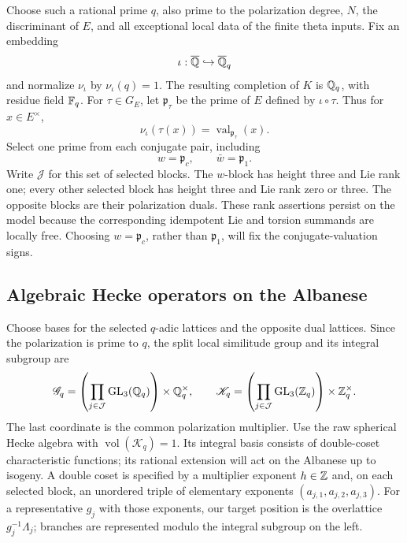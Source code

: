 Choose such a rational prime \(q\), also prime to the polarization
degree, \(N\), the discriminant of \(E\), and all exceptional local
data of the finite theta inputs.  Fix an embedding
\[
\iota:\overline{\mathbb{Q}}\hookrightarrow\overline{\mathbb{Q}}_q
\]
and normalize \(\nu_\iota\) by \(\nu_\iota(q)=1\).  The resulting
completion of \(K\) is \(\mathbb{Q}_q\), with residue field \(\mathbb{F}_q\).
For \(\tau\in G_E\), let \(\mathfrak p_\tau\) be the prime of \(E\)
defined by \(\iota\circ\tau\).  Thus for \(x\in E^\times\),
\[
\nu_\iota(\tau(x))=\operatorname{val}_{\mathfrak p_\tau}(x).
\]
Select one prime from each conjugate pair, including
\begin{equation}\label{eq:active-prime}
w=\mathfrak p_c,\qquad \bar w=\mathfrak p_1.
\end{equation}
Write \(\mathcal J\) for this set of selected blocks.  The
\(w\)-block has height three and Lie rank one; every other selected
block has height three and Lie rank zero or three.  The opposite
blocks are their polarization duals.  These rank assertions persist
on the model because the corresponding idempotent Lie and torsion
summands are locally free.  Choosing \(w=\mathfrak p_c\), rather
than \(\mathfrak p_1\), will fix the conjugate-valuation signs.

\subsection{Algebraic Hecke operators on the Albanese}\label{subsec:algebraic-hecke}

Choose bases for the selected \(q\)-adic lattices and the opposite
dual lattices.  Since the polarization is prime to \(q\), the split
local similitude group and its integral subgroup are
\[
\mathscr G_q=
\left(\prod_{j\in\mathcal J}\operatorname{GL}_3(\mathbb{Q}_q)\right)\times\mathbb{Q}_q^\times,
\qquad
\mathscr K_q=
\left(\prod_{j\in\mathcal J}\operatorname{GL}_3(\mathbb{Z}_q)\right)\times\mathbb{Z}_q^\times.
\]
The last coordinate is the common polarization multiplier.
Use the raw spherical Hecke algebra with
\(\operatorname{vol}(\mathscr K_q)=1\).  Its integral basis consists
of double-coset characteristic functions; its rational extension
will act on the Albanese up to isogeny.  A double coset is specified
by a multiplier exponent \(h\in\mathbb{Z}\) and, on each selected block,
an unordered triple of elementary exponents
\((a_{j,1},a_{j,2},a_{j,3})\).
For a representative \(g_j\) with those exponents, our target
position is the overlattice \(g_j^{-1}\Lambda_j\); branches are
represented modulo the integral subgroup on the left.

